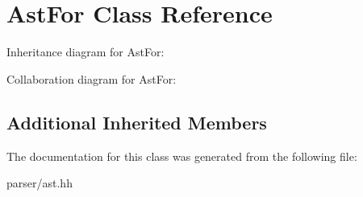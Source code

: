 \hypertarget{classAstFor}{}\section{Ast\+For Class Reference}
\label{classAstFor}


Inheritance diagram for Ast\+For\+:


Collaboration diagram for Ast\+For\+:
\subsection*{Additional Inherited Members}


The documentation for this class was generated from the following file\+:\begin{DoxyCompactItemize}
\item 
parser/ast.\+hh\end{DoxyCompactItemize}
